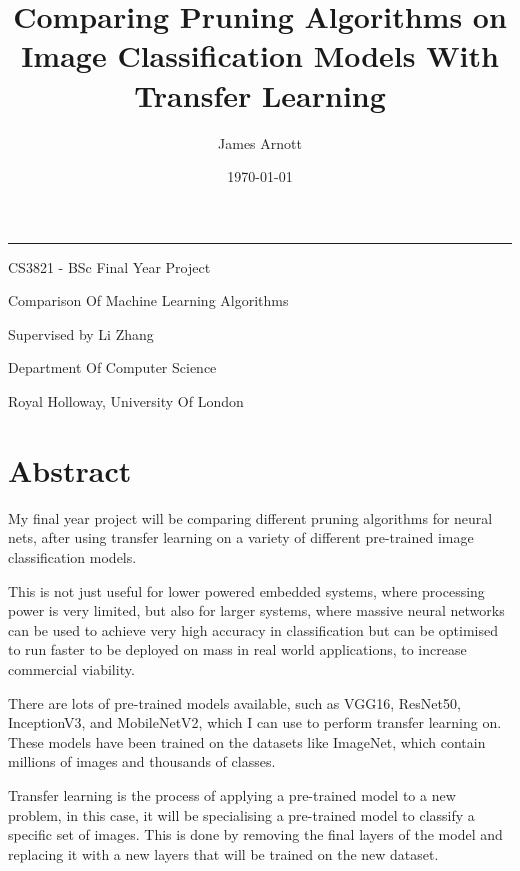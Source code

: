 \documentclass{article}
\title{\titleFont Comparing Pruning Algorithms on Image Classification Models With Transfer Learning}
\date{\Large \today}
\author{\subtitleFont James Arnott}
\begin{document}
\maketitle

\begin {center}
\noindent\rule{15cm}{0.4pt}
\end{center}

\vspace{1cm}

\begin{center}
	\begin{Large}
			CS3821 - BSc Final Year Project
			
			Comparison Of Machine Learning Algorithms

			Supervised by Li Zhang

			\vspace{0.6cm}

			Department Of Computer Science

			\vspace{0.2cm}

			Royal Holloway, University Of London
	\end{Large}
\end{center}


\pagebreak

\section{Abstract}
My final year project will be comparing different pruning algorithms for neural nets,
after using transfer learning on a variety of different pre-trained image classification models.

This is not just useful for lower powered embedded systems\cite{EmbeddedSystems},
where processing power is very limited, but also for larger systems,
where massive neural networks can be used to achieve very
high accuracy in classification but can be optimised to run faster
to be deployed on mass in real world applications, to increase
commercial viability.

There are lots of pre-trained models available, such as VGG16, ResNet50, InceptionV3,
and MobileNetV2, which I can use to perform transfer learning on. These models
have been trained on the datasets like ImageNet\cite{ImageNet}, which contain millions of images
and thousands of classes.

Transfer learning is the process of applying a pre-trained model to a new problem,
in this case, it will be specialising a pre-trained model to classify a specific set of images.
This is done by removing the final layers of the model and replacing it with a new layers
that will be trained on the new dataset.
\end{document}
